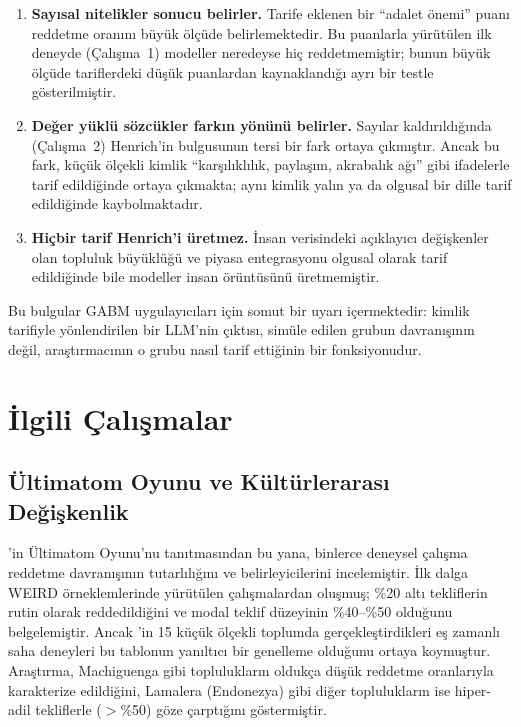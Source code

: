 \documentclass[11pt]{article}
\begin{document}
\begin{enumerate}
\item \textbf{Sayısal nitelikler sonucu belirler.} Tarife eklenen bir ``adalet önemi'' puanı reddetme oranını büyük ölçüde belirlemektedir. Bu puanlarla yürütülen ilk deneyde (Çalışma~1) modeller neredeyse hiç reddetmemiştir; bunun büyük ölçüde tariflerdeki düşük puanlardan kaynaklandığı ayrı bir testle gösterilmiştir.
\item \textbf{Değer yüklü sözcükler farkın yönünü belirler.} Sayılar kaldırıldığında (Çalışma~2) Henrich'in bulgusunun tersi bir fark ortaya çıkmıştır. Ancak bu fark, küçük ölçekli kimlik ``karşılıklılık, paylaşım, akrabalık ağı'' gibi ifadelerle tarif edildiğinde ortaya çıkmakta; aynı kimlik yalın ya da olgusal bir dille tarif edildiğinde kaybolmaktadır.
\item \textbf{Hiçbir tarif Henrich'i üretmez.} İnsan verisindeki açıklayıcı değişkenler olan topluluk büyüklüğü ve piyasa entegrasyonu olgusal olarak tarif edildiğinde bile modeller insan örüntüsünü üretmemiştir.
\end{enumerate}

Bu bulgular GABM uygulayıcıları için somut bir uyarı içermektedir: kimlik tarifiyle yönlendirilen bir LLM'nin çıktısı, simüle edilen grubun davranışının değil, araştırmacının o grubu nasıl tarif ettiğinin bir fonksiyonudur.


\section{İlgili Çalışmalar}

\subsection{Ültimatom Oyunu ve Kültürlerarası Değişkenlik}

\citet{guth1982}'in Ültimatom Oyunu'nu tanıtmasından bu yana, binlerce deneysel çalışma reddetme davranışının tutarlılığını ve belirleyicilerini incelemiştir. İlk dalga WEIRD örneklemlerinde yürütülen çalışmalardan oluşmuş; \%20 altı tekliflerin rutin olarak reddedildiğini ve modal teklif düzeyinin \%40--\%50 olduğunu belgelemiştir. Ancak \citet{henrich2001}'in 15 küçük ölçekli toplumda gerçekleştirdikleri eş zamanlı saha deneyleri bu tablonun yanıltıcı bir genelleme olduğunu ortaya koymuştur. Araştırma, Machiguenga gibi toplulukların oldukça düşük reddetme oranlarıyla karakterize edildiğini, Lamalera (Endonezya) gibi diğer toplulukların ise hiper-adil tekliflerle ($>$\%50) göze çarptığını göstermiştir.
\end{document}
